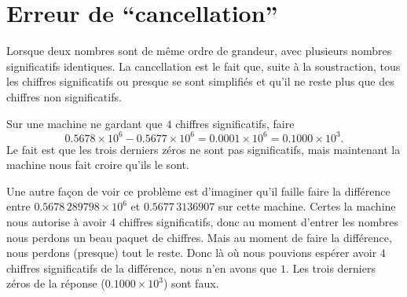 \section{Erreur de ``cancellation''}

Lorsque deux nombres sont de même ordre de grandeur, avec plusieurs nombres significatifs identiques. La cancellation est le fait que, suite à la soustraction, tous les chiffres significatifs ou presque se sont simplifiés et qu'il ne reste plus que des chiffres non significatifs. 

\begin{example}
    Sur une machine ne gardant que \( 4\) chiffres significatifs, faire
    \begin{equation}
        0.5678\times 10^6-0.5677\times 10^6 = 0.0001\times 10^6=0.1000\times 10^3.
    \end{equation}
    Le fait est que les trois derniers zéros ne sont pas significatifs, mais maintenant la machine nous fait croire qu'ils le sont.

    Une autre façon de voir ce problème est d'imaginer qu'il faille faire la différence entre \( 0.5678\,289798\times 10^6\) et \( 0.5677\,3136907\) sur cette machine. Certes la machine nous autorise à avoir \( 4\) chiffres significatifs, donc au moment d'entrer les nombres nous perdons un beau paquet de chiffres. Mais au moment de faire la différence, nous perdons (presque) tout le reste. Donc là où nous pouvions espérer avoir \( 4\) chiffres significatifs de la différence, nous n'en avons que \( 1\). Les trois derniers zéros de la réponse (\( 0.1000\times 10^3\)) sont faux.
\end{example}

